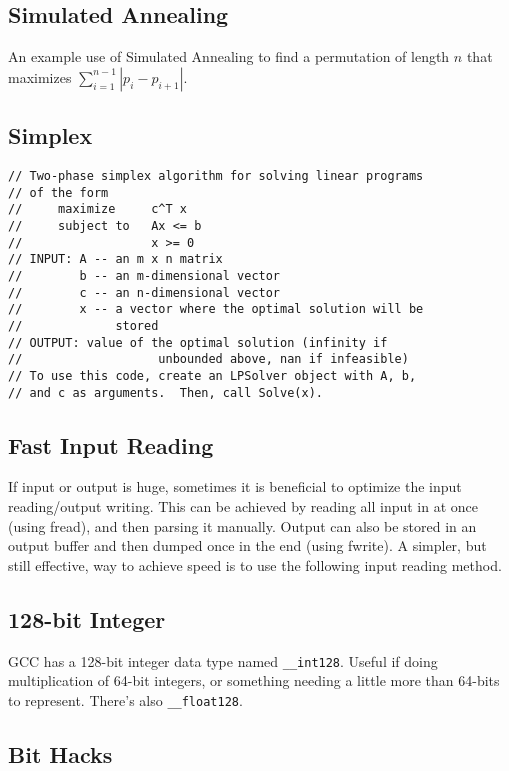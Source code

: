   \subsection{Simulated Annealing}
    An example use of Simulated Annealing to find a permutation of length $n$
    that maximizes $\sum_{i=1}^{n-1}|p_i - p_{i+1}|$.
  \subsection{Simplex}
    \begin{verbatim}
// Two-phase simplex algorithm for solving linear programs
// of the form
//     maximize     c^T x
//     subject to   Ax <= b
//                  x >= 0
// INPUT: A -- an m x n matrix
//        b -- an m-dimensional vector
//        c -- an n-dimensional vector
//        x -- a vector where the optimal solution will be
//             stored
// OUTPUT: value of the optimal solution (infinity if
//                   unbounded above, nan if infeasible)
// To use this code, create an LPSolver object with A, b,
// and c as arguments.  Then, call Solve(x).
    \end{verbatim}
  \subsection{Fast Input Reading}
    If input or output is huge, sometimes it is beneficial to optimize the
    input reading/output writing. This can be achieved by reading all input
    in at once (using fread), and then parsing it manually. Output can also
    be stored in an output buffer and then dumped once in the end (using
    fwrite). A simpler, but still effective, way to achieve speed is to use
    the following input reading method.
  \subsection{128-bit Integer}
    GCC has a 128-bit integer data type named \texttt{\_\_int128}. Useful
    if doing multiplication of 64-bit integers, or something needing a
    little more than 64-bits to represent. There's also
    \texttt{\_\_float128}.
  \subsection{Bit Hacks}
